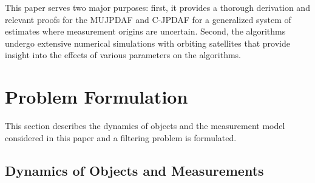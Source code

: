 \documentclass[letterpaper, paper,10pt]{AAS}		%
\begin{document}
This paper serves two major purposes:
first, it provides a thorough derivation and relevant proofs for the MUJPDAF and C-JPDAF for a generalized system of estimates where measurement origins are uncertain.
Second, the algorithms undergo extensive numerical simulations with orbiting satellites that provide insight into the effects of various parameters on the algorithms.

%
%


\section{Problem Formulation}

This section describes the dynamics of objects and the measurement model considered in this paper and a filtering problem is formulated. 


\subsection{Dynamics of Objects and Measurements}

%
\end{document}
